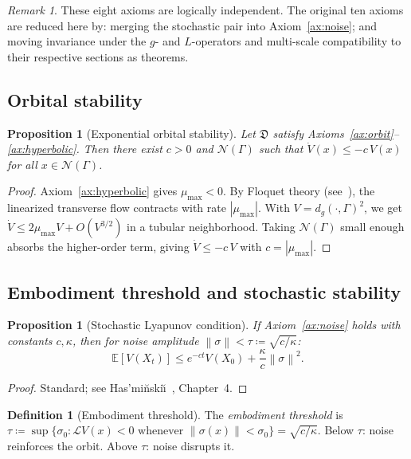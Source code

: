 \documentclass[12pt, oneside]{book}
\theoremstyle{plain}
\newtheorem{proposition}[theorem]{Proposition}
\theoremstyle{definition}
\newtheorem{definition}{Definition}[section]
\theoremstyle{remark}
\newtheorem{remark}{Remark}[section]
\newcommand{\dm}{\mathfrak{D}}
\newcommand{\Orb}{\Gamma}
\newcommand{\cN}{\mathcal{N}}
\newcommand{\cL}{\mathcal{L}}
\newcommand{\dg}{d_g}
\newcommand{\norm}[1]{\left\|#1\right\|}
\newcommand{\abs}[1]{\left|#1\right|}
\begin{document}
\begin{remark}
These eight axioms are logically independent. The original ten axioms
are reduced here by: merging the stochastic pair into
Axiom~\ref{ax:noise}; and moving invariance under the $g$- and
$L$-operators and multi-scale compatibility to their respective
sections as theorems.
\end{remark}

\subsection{Orbital stability}

\begin{proposition}[Exponential orbital stability]\label{prop:orbital}
Let $\dm$ satisfy Axioms~\ref{ax:orbit}--\ref{ax:hyperbolic}. Then
there exist $c>0$ and $\cN(\Orb)$ such that
$\dot V(x)\le -c\,V(x)$ for all $x\in\cN(\Orb)$.
\end{proposition}

\begin{proof}
Axiom~\ref{ax:hyperbolic} gives $\mu_{\max}<0$. By Floquet theory
(see~\cite{GH,Shub}), the linearized transverse flow contracts with
rate $\abs{\mu_{\max}}$. With $V=\dg(\cdot,\Orb)^2$, we get
$\dot V\le 2\mu_{\max}V+O(V^{3/2})$ in a tubular neighborhood.
Taking $\cN(\Orb)$ small enough absorbs the higher-order term,
giving $\dot V\le -c\,V$ with $c=\abs{\mu_{\max}}$.
\end{proof}

\subsection{Embodiment threshold and stochastic stability}

\begin{proposition}[Stochastic Lyapunov condition]\label{prop:stoch}
If Axiom~\ref{ax:noise} holds with constants $c,\kappa$, then for
noise amplitude $\norm\sigma<\tau\coloneqq\sqrt{c/\kappa}$:
\[
  \mathbb{E}[V(X_t)]\le e^{-ct}V(X_0)+\frac{\kappa}{c}\norm\sigma^2.
\]
\end{proposition}

\begin{proof}
Standard; see Has'mi\u{n}ski\u{\i}~\cite{Hasminski}, Chapter~4.
\end{proof}

\begin{definition}[Embodiment threshold]\label{def:threshold}
The \emph{embodiment threshold} is
$\tau\coloneqq\sup\{\sigma_0:\cL V(x)<0\text{ whenever }
\norm{\sigma(x)}<\sigma_0\}=\sqrt{c/\kappa}$.
Below $\tau$: noise reinforces the orbit. Above $\tau$: noise
disrupts it.
\end{definition}
\end{document}
